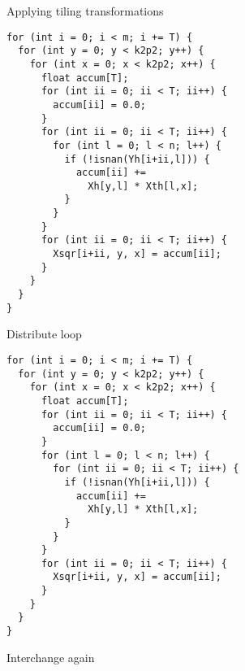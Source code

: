 \begin{frame}[fragile]{Applying tiling transformations}
\begin{minipage}{.55\textwidth}
\begin{verbatim}
for (int i = 0; i < m; i += T) {
  for (int y = 0; y < k2p2; y++) {
    for (int x = 0; x < k2p2; x++) {
      float accum[T];
      for (int ii = 0; ii < T; ii++) {
        accum[ii] = 0.0;
      }
      for (int ii = 0; ii < T; ii++) {
        for (int l = 0; l < n; l++) {
          if (!isnan(Yh[i+ii,l])) {
            accum[ii] +=
              Xh[y,l] * Xth[l,x];
          }
        }
      }
      for (int ii = 0; ii < T; ii++) {
        Xsqr[i+ii, y, x] = accum[ii];
      }
    }
  }
}
\end{verbatim}
\begin{center}
  Distribute loop
\end{center}
\end{minipage}%
\begin{minipage}{.5\textwidth}
  \centering
  \begin{verbatim}
for (int i = 0; i < m; i += T) {
  for (int y = 0; y < k2p2; y++) {
    for (int x = 0; x < k2p2; x++) {
      float accum[T];
      for (int ii = 0; ii < T; ii++) {
        accum[ii] = 0.0;
      }
      for (int l = 0; l < n; l++) {
        for (int ii = 0; ii < T; ii++) {
          if (!isnan(Yh[i+ii,l])) {
            accum[ii] +=
              Xh[y,l] * Xth[l,x];
          }
        }
      }
      for (int ii = 0; ii < T; ii++) {
        Xsqr[i+ii, y, x] = accum[ii];
      }
    }
  }
}
\end{verbatim}
\begin{center}
  Interchange again
\end{center}
\end{minipage}
\end{frame}

